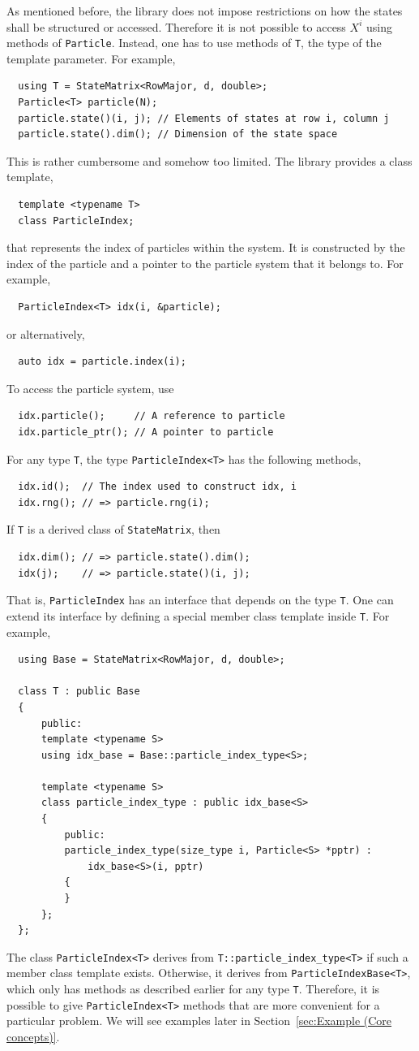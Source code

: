 As mentioned before, the library does not impose restrictions on how the states
shall be structured or accessed. Therefore it is not possible to access $X^i$
using methods of \verb|Particle|. Instead, one has to use methods of \verb|T|,
the type of the template parameter. For example,
\begin{Verbatim}
  using T = StateMatrix<RowMajor, d, double>;
  Particle<T> particle(N);
  particle.state()(i, j); // Elements of states at row i, column j
  particle.state().dim(); // Dimension of the state space
\end{Verbatim}
This is rather cumbersome and somehow too limited. The library provides a class
template,
\begin{Verbatim}
  template <typename T>
  class ParticleIndex;
\end{Verbatim}
that represents the index of particles within the system. It is constructed by
the index of the particle and a pointer to the particle system that it belongs
to. For example,
\begin{Verbatim}
  ParticleIndex<T> idx(i, &particle);
\end{Verbatim}
or alternatively,
\begin{Verbatim}
  auto idx = particle.index(i);
\end{Verbatim}
To access the particle system, use
\begin{Verbatim}
  idx.particle();     // A reference to particle
  idx.particle_ptr(); // A pointer to particle
\end{Verbatim}
For any type \verb|T|, the type \verb|ParticleIndex<T>| has the following
methods,
\begin{Verbatim}
  idx.id();  // The index used to construct idx, i
  idx.rng(); // => particle.rng(i);
\end{Verbatim}
If \verb|T| is a derived class of \verb|StateMatrix|, then
\begin{Verbatim}
  idx.dim(); // => particle.state().dim();
  idx(j);    // => particle.state()(i, j);
\end{Verbatim}
That is, \verb|ParticleIndex| has an interface that depends on the type
\verb|T|. One can extend its interface by defining a special member class
template inside \verb|T|. For example,
\begin{Verbatim}
  using Base = StateMatrix<RowMajor, d, double>;

  class T : public Base
  {
      public:
      template <typename S>
      using idx_base = Base::particle_index_type<S>;

      template <typename S>
      class particle_index_type : public idx_base<S>
      {
          public:
          particle_index_type(size_type i, Particle<S> *pptr) :
              idx_base<S>(i, pptr)
          {
          }
      };
  };
\end{Verbatim}
The class \verb|ParticleIndex<T>| derives from \verb|T::particle_index_type<T>|
if such a member class template exists. Otherwise, it derives from
\verb|ParticleIndexBase<T>|, which only has methods as described earlier for
any type \verb|T|. Therefore, it is possible to give \verb|ParticleIndex<T>|
methods that are more convenient for a particular problem. We will see examples
later in Section~\ref{sec:Example (Core concepts)}.


